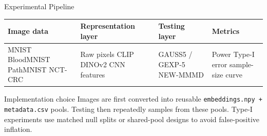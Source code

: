 \documentclass[aspectratio=169,11pt]{beamer}
\begin{document}
\begin{frame}{Experimental Pipeline}
  \centering
  \begin{tabular}{>{\centering\arraybackslash}p{}
                  >{\centering\arraybackslash}p{}
                  >{\centering\arraybackslash}p{}
                  >{\centering\arraybackslash}p{}}
    \toprule
    Image data & Representation layer & Testing layer & Metrics \\
    \midrule
    MNIST \newline BloodMNIST \newline PathMNIST \newline NCT-CRC
    &
    Raw pixels \newline CLIP \newline DINOv2 \newline CNN features
    &
    GAUSS5 / GEXP-5 \newline NEW-MMMD
    &
    Power \newline Type-I error \newline sample-size curve \\
    \bottomrule
  \end{tabular}

  \vspace{1.3em}
  \begin{block}{Implementation choice}
    Images are first converted into reusable \texttt{embeddings.npy + metadata.csv} pools.
    Testing then repeatedly samples from these pools. Type-I experiments use matched null splits or shared-pool designs to avoid false-positive inflation.
  \end{block}
\end{frame}
\end{document}
